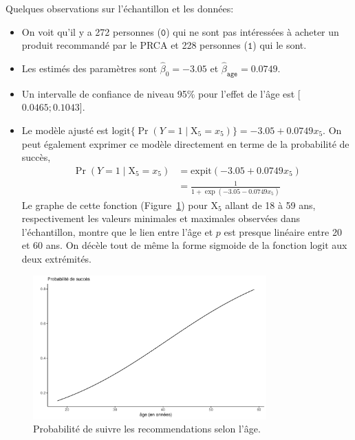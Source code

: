 \documentclass[
  11pt,
  letterpaper,
]{scrbook}
\providecommand{\tightlist}{%
  \setlength{\itemsep}{0pt}\setlength{\parskip}{0pt}}\usepackage{longtable,booktabs,array}
\theoremstyle{definition}
\theoremstyle{remark}
\begin{document}
Quelques observations sur l'échantillon et les données:

\begin{itemize}
\tightlist
\item
  On voit qu'il y a 272 personnes (\(\texttt{0}\)) qui ne sont pas
  intéressées à acheter un produit recommandé par le PRCA et 228
  personnes (\(\texttt{1}\)) qui le sont.
\item
  Les estimés des paramètres sont \(\widehat{\beta}_0 = -3.05\) et
  \(\widehat{\beta}_{\texttt{age}}=0.0749\).
\item
  Un intervalle de confiance de niveau 95\% pour l'effet de l'âge est
  {[}\(0.0465; 0.1043\){]}.
\item
  Le modèle ajusté est
  \(\textrm{logit}\{\Pr(Y=1 \mid \mathrm{X}_5=x_5)\} = -3.05 + 0.0749 x_5\).
  On peut également exprimer ce modèle directement en terme de la
  probabilité de succès, \begin{align*}
  \Pr(Y=1 \mid \mathrm{X}_5=x_5) &= \textrm{expit}(-3.05 + 0.0749 x_5) \\&= \frac{1}{1+\exp(-3.05 - 0.0749 x_5)}
  \end{align*} Le graphe de cette fonction (Figure~\ref{fig-logitplot2})
  pour \(\mathrm{X}_5\) allant de 18 à 59 ans, respectivement les
  valeurs minimales et maximales observées dans l'échantillon, montre
  que le lien entre l'âge et \(p\) est presque linéaire entre 20 et 60
  ans. On décèle tout de même la forme sigmoide de la fonction
  \(\textrm{logit}\) aux deux extrémités.
\end{itemize}

\begin{figure}[ht!]

{\centering \includegraphics[width=0.8\textwidth,height=\textheight]{./05-reglogistique_files/figure-pdf/fig-logitplot2-1.pdf}

}

\caption{\label{fig-logitplot2}Probabilité de suivre les recommendations
selon l'âge.}

\end{figure}
\end{document}
